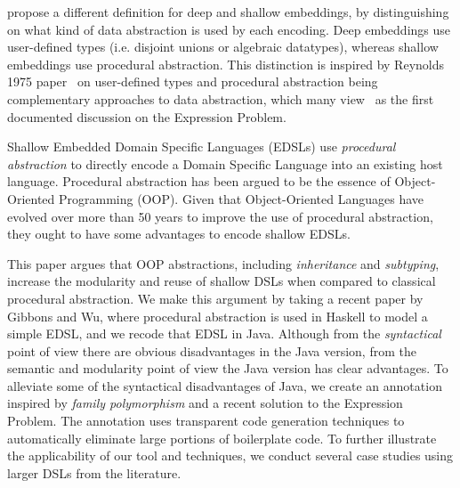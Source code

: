 propose a different definition for deep and shallow
embeddings, by distinguishing on what kind of data abstraction is used
by each encoding. Deep embeddings use user-defined types
(i.e. disjoint unions or algebraic datatypes), whereas shallow
embeddings use procedural abstraction. This distinction is inspired by
Reynolds 1975 paper~\cite{} on user-defined types and procedural
abstraction being complementary approaches to data abstraction, which
many view~\cite{} as the first documented discussion on the Expression
Problem. 



Shallow Embedded Domain Specific Languages (EDSLs) use
\emph{procedural abstraction} to directly encode a Domain Specific
Language into an existing host language. Procedural abstraction has
been argued to be the essence of Object-Oriented Programming (OOP). Given
that Object-Oriented Languages have evolved over more than 50 years 
to improve the use of procedural abstraction, they ought to have some 
advantages to encode shallow EDSLs. 

This paper argues that OOP abstractions, including \emph{inheritance}
and \emph{subtyping}, increase the modularity and reuse of shallow
DSLs when compared to classical procedural abstraction. We make this
argument by taking a recent paper by Gibbons and Wu, where procedural
abstraction is used in Haskell to model a simple EDSL, and we recode
that EDSL in Java. Although from the \emph{syntactical} point of view
there are obvious disadvantages in the Java version, from the semantic
and modularity point of view the Java version has clear advantages.
To alleviate some of the syntactical disadvantages of Java, we create
an annotation inspired by \emph{family polymorphism} and a recent
solution to the Expression Problem. 
The annotation uses transparent code generation techniques to
automatically eliminate large portions of boilerplate code.
To further illustrate the applicability of our tool and techniques, we conduct 
several case studies using larger DSLs from the literature. 